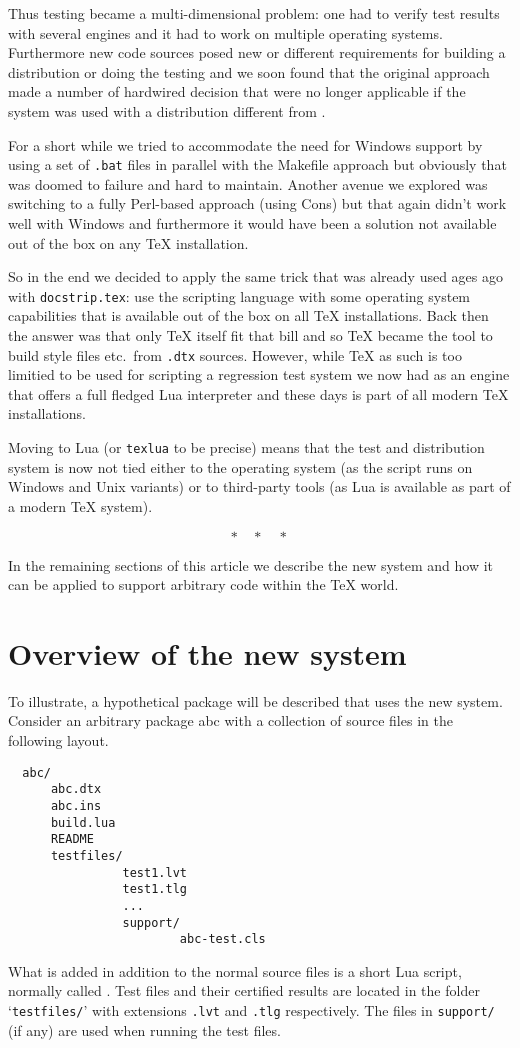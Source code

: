 \documentclass[a4paper]{ltugboat}
\begin{document}
Thus testing became a multi-dimensional problem: one had to verify
test results with several engines and it had to work on multiple
operating systems. Furthermore new code sources posed new or different
requirements for building a distribution or doing the testing and
we soon found that the original approach made a number of hardwired
decision that were no longer applicable if the system was used with a
distribution different from \LaTeXe{}.

For a short while we tried to accommodate the need for Windows support
by using a set of \texttt{.bat} files in parallel with the Makefile
approach but obviously that was doomed to failure and hard to
maintain. Another avenue we explored was switching to a fully
Perl-based approach (using Cons) but that again didn't work well with
Windows and furthermore it would have been a solution not available
out of the box on any \TeX{} installation.

So in the end we decided to apply the same trick that was already used
ages ago with \texttt{docstrip.tex}: use the scripting language with
some operating system capabilities that is available out of the box on
all \TeX{} installations. Back then the answer was that only \TeX{} itself
fit that bill and so \TeX{} became the tool to build style files
etc.\ from \texttt{.dtx} sources. However, while \TeX{} as such is too
limitied to be used for scripting a regression test system we now had
\luaTeX{} as an engine that offers a full fledged Lua interpreter\Dash
and these days \luaTeX{} is part of all modern \TeX{} installations.

Moving to Lua (or \texttt{texlua} to be precise) means that the test
and distribution system is now not tied either to the operating system
(as the script runs on Windows and Unix variants) or to third-party
tools (as Lua is available as part of a modern \TeX{} system).

\[
  * \quad * \quad *
\]

In the remaining sections of this article we describe the new system
and how it can be applied to support arbitrary code within the \TeX{}
world.

\section{Overview of the new system}
\label{sec:overview}

To illustrate, a hypothetical package will be described that
uses the new system.
Consider an arbitrary package \textsf{abc} with a collection of source
files in the following layout.
\begin{Verbatim}
  abc/
      abc.dtx
      abc.ins
      build.lua
      README
      testfiles/
                test1.lvt
                test1.tlg
                ...
                support/
                        abc-test.cls
\end{Verbatim}
What is added in addition to the normal source files is a short Lua
script, normally called \texttt{\drivername}.  Test files and their
certified results are located in the folder `\texttt{testfiles/}'
with extensions \texttt{.lvt} and \texttt{.tlg} respectively.  The files in
\texttt{support/} (if any) are used when running the test files.
\end{document}
